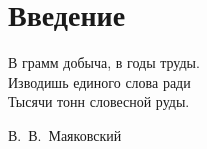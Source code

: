 \chapter*{Введение}							%
\epigraph{В грамм добыча, в годы труды.\\
Изводишь единого слова ради\\
Тысячи тонн словесной руды.}{В.~В.~Маяковский} 


\clearpage